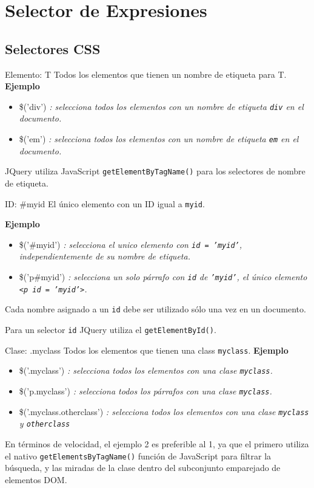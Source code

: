 \section{Selector de Expresiones}

\subsection{Selectores CSS} %

\begin{frame}[fragile]{Elemento: T} %
Todos los elementos que tienen un nombre de etiqueta para T.
\textbf{Ejemplo}
\begin{itemize}
    \item \$('div') \textit{: selecciona todos los elementos con un nombre de etiqueta
    \texttt{div} en el documento.} 
    \item \$('em') \textit{: selecciona todos los elementos con un nombre de etiqueta
    \texttt{em} en el documento.}
\end{itemize}
JQuery utiliza JavaScript \texttt{getElementByTagName()} para los selectores de
nombre de etiqueta.
\end{frame}

\begin{frame}[fragile]{ID: \#myid} %
El único elemento con un ID igual a \texttt{myid}.

\textbf{Ejemplo}
\begin{itemize}
    \item \$('\#myid') \textit{: selecciona el unico elemento con \texttt{id = 'myid'},
    independientemente de su nombre de etiqueta. }
    \item \$('p\#myid') \textit{: selecciona un solo párrafo con \texttt{id} de
    \texttt{'myid'}, el único elemento \texttt{<p id = 'myid'>}. }
\end{itemize}
Cada nombre asignado a un \texttt{id} debe ser utilizado sólo una vez en un
documento.

Para un selector \texttt{id} JQuery utiliza el \texttt{getElementById()}.
\end{frame}

\begin{frame}[fragile]{Clase: .myclass} %
Todos los elementos que tienen una class \texttt{myclass}.
\textbf{Ejemplo}
\begin{itemize}
    \item \$('.myclass') \textit{: selecciona todos los elementos con una clase
    \texttt{myclass}.} 
    \item \$('p.myclass') \textit{: selecciona todos los párrafos con una clase 
    \texttt{myclass}.} 
    \item \$('.myclass.otherclass') \textit{: selecciona todos los elementos
    con una clase \texttt{myclass} y \texttt{otherclass} }
\end{itemize}
En términos de velocidad,  el ejemplo 2 es preferible al 1,  ya que el primero
utiliza el nativo \texttt{getElementsByTagName()} función de JavaScript para
filtrar la búsqueda, y las miradas de la clase dentro del subconjunto
emparejado de elementos DOM. 
\end{frame}

